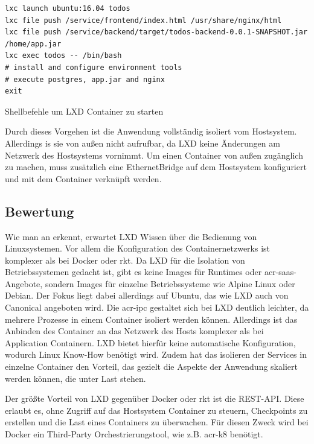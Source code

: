\begin{listing}[h]
	\begin{verbatim}
lxc launch ubuntu:16.04 todos
lxc file push /service/frontend/index.html /usr/share/nginx/html
lxc file push /service/backend/target/todos-backend-0.0.1-SNAPSHOT.jar /home/app.jar
lxc exec todos -- /bin/bash
# install and configure environment tools
# execute postgres, app.jar and nginx
exit
	\end{verbatim}
	\caption{Shellbefehle um LXD Container zu starten}
	\label{lst:lxdConfig}
\end{listing}

Durch dieses Vorgehen ist die Anwendung vollständig isoliert vom Hostsystem. Allerdings is sie von außen nicht aufrufbar, da LXD keine Änderungen am Netzwerk des Hostsystems vornimmt. Um einen Container von außen zugänglich zu machen, muss zusätzlich eine EthernetBridge auf dem Hostsystem konfiguriert und mit dem Container verknüpft werden.

\subsection{Bewertung}
\label{sec:compLXDBewertung}
Wie man an  erkennt, erwartet LXD Wissen über die Bedienung von Linuxsystemen. Vor allem die Konfiguration des Containernetzwerks ist komplexer als bei Docker oder rkt. Da LXD für die Isolation von Betriebssystemen gedacht ist, gibt es keine Images für Runtimes oder \gls{acr-saas}-Angebote, sondern Images für einzelne Betriebssysteme wie Alpine Linux oder Debian. Der Fokus liegt dabei allerdings auf Ubuntu, das wie LXD auch von Canonical angeboten wird. Die \gls{acr-ipc} gestaltet sich bei LXD deutlich leichter, da mehrere Prozesse in einem Container isoliert werden können. Allerdings ist das Anbinden des Container an das Netzwerk des Hosts komplexer als bei Application Containern. LXD bietet hierfür keine automatische Konfiguration, wodurch Linux Know-How benötigt wird. Zudem hat das isolieren der Services in einzelne Container den Vorteil, das gezielt die Aspekte der Anwendung skaliert werden können, die unter Last stehen.

Der größte Vorteil von LXD gegenüber Docker oder rkt ist die REST-API. Diese erlaubt es, ohne Zugriff auf das Hostsystem Container zu steuern, Checkpoints zu erstellen und die Last eines Containers zu überwachen. Für diesen Zweck wird bei Docker ein Third-Party Orchestrierungstool, wie z.B. \gls{acr-k8} benötigt.

